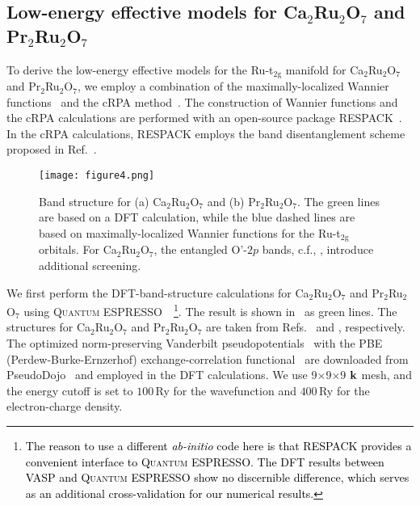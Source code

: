 \documentclass[10pt]{iopart}
\newcommand{\red}[1]{\textcolor{black}{#1}}
\begin{document}
\subsection{Low-energy effective models for \texorpdfstring{Ca$_2$Ru$_2$O$_7$}{Ca2Ru2O7} and \texorpdfstring{Pr$_2$Ru$_2$O$_7$}{Pr2Ru2O7}}


To derive the low-energy effective models for the Ru-t$_{2\mathrm{g}}$ manifold for Ca$_2$Ru$_2$O$_7$ and Pr$_2$Ru$_2$O$_7$, we employ a combination of the maximally-localized Wannier functions~\cite{marzari1997maximally,souza2001maximally} and the cRPA method~\cite{aryasetiawan2004frequency}. 
The construction of Wannier functions and the cRPA calculations are performed with an open-source package RESPACK~\cite{nakamura2021RESPACK,RESPACK_URL}. 
In the cRPA calculations, RESPACK employs the band disentanglement scheme proposed in Ref.~\cite{sasioglu2011effective}. 

\begin{figure}
  \texttt{[image: figure4.png]}
  \caption{Band structure for (a) Ca$_2$Ru$_2$O$_7$ and (b) Pr$_2$Ru$_2$O$_7$. The green lines are based on a DFT calculation, while the blue dashed lines are based on maximally-localized Wannier functions for the Ru-t$_{2\mathrm{g}}$ orbitals. For Ca$_2$Ru$_2$O$_7$, the entangled O'-$2p$ bands, c.f., , introduce additional screening.
  \label{fig:4}
  }
\end{figure}

We first perform the DFT-band-structure calculations for Ca$_2$Ru$_2$O$_7$ and Pr$_2$Ru$_2$O$_7$ using {\textsc{Quantum ESPRESSO}}~\cite{giannozzi2017advanced}~\footnote{\red{The reason to use a different \emph{ab-initio} code here is that RESPACK provides a convenient interface to {\textsc{Quantum ESPRESSO}}. The DFT results between VASP and {\textsc{Quantum ESPRESSO}} show no discernible difference, which serves as an additional cross-validation for our numerical results.}}. The result is shown in~ as green lines. 
The structures for Ca$_2$Ru$_2$O$_7$ and Pr$_2$Ru$_2$O$_7$ are taken from Refs.~\cite{munenaka2006novel} and \cite{yamamoto1994crystal}, respectively. 
The optimized norm-preserving Vanderbilt pseudopotentials~\cite{hamann2013optimized} with the PBE (Perdew-Burke-Ernzerhof) exchange-correlation functional~\cite{perdew1996generalized} are downloaded from PseudoDojo~\cite{setten2018pseudodojo} and employed in the DFT calculations.
We use 9$\times$9$\times$9 $\bf{k}$ mesh, and the energy cutoff is set to $100\,$Ry for the wavefunction and $400\,$Ry for the electron-charge density.
\end{document}
